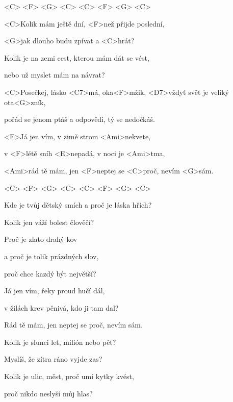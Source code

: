 


<C> <F> <G> <C> <C> <F> <G> <C>

\zs
<C>Kolik mám ještě dní, <F>než přijde poslední,

<G>jak dlouho budu zpívat a <C>hrát?

Kolik je na zemi cest, kterou mám dát se vést,

nebo už myslet mám na návrat?
\ks

\zr
<C>Posečkej, lásko <C7>má, oka<F>mžik,
<D7>vždyť svět je veliký ota<G>zník,

pořád se jenom ptáš a odpovědi, tý se nedočkáš.
\kr

\zr
<E>Já jen vím, v zimě strom <Ami>nekvete,

v <F>létě sníh <E>nepadá, v noci je <Ami>tma,

<Ami>rád tě mám,
jen <F>neptej se <C>proč, nevím <G>sám.
\kr

<C> <F> <G> <C> <C> <F> <G> <C>

\zs
Kde je tvůj dětský smích a proč je láska hřích?

Kolik jen váží bolest člověčí?

Proč je zlato drahý kov

a proč je tolik prázdných slov,

proč chce kazdý být největší?
\ks

\zr \kr

\zr
Já jen vím, řeky proud hučí dál,

v žilách krev pěnivá, kdo ji tam dal?

Rád tě mám, jen neptej se proč, nevím sám.
\kr

\zs
Kolik je slunci let, milión nebo pět?

Myslíš, že zítra ráno vyjde zas?

Kolik je ulic, měst, proč umí kytky kvést,

proč nikdo neslyší můj hlas?
\ks

\kp
